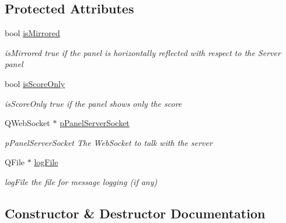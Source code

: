 \subsection*{Protected Attributes}
\begin{DoxyCompactItemize}
\item 
\mbox{\label{classScorePanel_a3b001ed021b760e5bda4295abaefd9a4}} 
bool \mbox{\hyperlink{classScorePanel_a3b001ed021b760e5bda4295abaefd9a4}{is\+Mirrored}}
\begin{DoxyCompactList}\small\item\em is\+Mirrored true if the panel is horizontally reflected with respect to the Server panel \end{DoxyCompactList}\item 
\mbox{\label{classScorePanel_a456c2efbb7e8413f8afb17216660df88}} 
bool \mbox{\hyperlink{classScorePanel_a456c2efbb7e8413f8afb17216660df88}{is\+Score\+Only}}
\begin{DoxyCompactList}\small\item\em is\+Score\+Only true if the panel shows only the score \end{DoxyCompactList}\item 
\mbox{\label{classScorePanel_ad2b6e8a77924b133db90d2cde1081cb3}} 
Q\+Web\+Socket $\ast$ \mbox{\hyperlink{classScorePanel_ad2b6e8a77924b133db90d2cde1081cb3}{p\+Panel\+Server\+Socket}}
\begin{DoxyCompactList}\small\item\em p\+Panel\+Server\+Socket The Web\+Socket to talk with the server \end{DoxyCompactList}\item 
\mbox{\label{classScorePanel_aaa305ae954a9fd367f97741eefcf7673}} 
Q\+File $\ast$ \mbox{\hyperlink{classScorePanel_aaa305ae954a9fd367f97741eefcf7673}{log\+File}}
\begin{DoxyCompactList}\small\item\em log\+File the file for message logging (if any) \end{DoxyCompactList}\end{DoxyCompactItemize}


\subsection{Constructor \& Destructor Documentation}
\mbox{\label{classScorePanel_aa3b9debfef09f1bce6510d4318f7841e}} 
